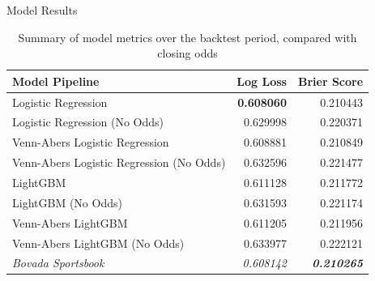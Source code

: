 \documentclass[final]{beamer}
\newlength{\colwidth}
\begin{document}
\begin{frame}[t]
\begin{columns}[t]
\begin{column}{\colwidth}
\begin{block}{Model Results}
    \scriptsize
    \begin{table}[]
    \begin{tabular}{@{}lrr@{}}
    \toprule
    Model Pipeline                           & Log Loss          & Brier Score       \\ \midrule
    Logistic Regression                      & \textbf{0.608060} & 0.210443 \\
    Logistic Regression (No Odds)            & 0.629998          & 0.220371          \\
    Venn-Abers Logistic Regression           & 0.608881          & 0.210849          \\
    Venn-Abers Logistic Regression (No Odds) & 0.632596          & 0.221477          \\
    LightGBM                                 & 0.611128          & 0.211772          \\
    LightGBM (No Odds)                       & 0.631593          & 0.221174          \\
    Venn-Abers LightGBM                      & 0.611205          & 0.211956          \\
    Venn-Abers LightGBM (No Odds)            & 0.633977          & 0.222121          \\ \midrule
    \textit{Bovada Sportsbook}               & \textit{0.608142} & \textbf{\textit{0.210265}} \\ \bottomrule
    \end{tabular}
    \caption{Summary of model metrics over the backtest period, compared with closing odds}
    \end{table}
    \normalsize
    \vspace{-20pt}
    \begin{figure}
        \centering
        \captionsetup{justification=centering}
        \begin{subfigure}{.24\linewidth}
            \centering

\end{subfigure}
\end{figure}
\end{block}
\end{column}
\end{columns}
\end{frame}
\end{document}
